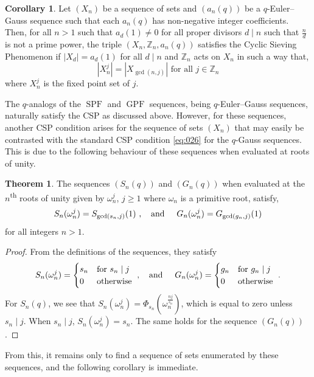 \documentclass{article}
\numberwithin{equation}{section}
\theoremstyle{definition}
\newtheorem{corollary}[definition]{\bf {Corollary}}
\newtheorem{theorem}[definition]{\bf {Theorem}}
\begin{document}
\begin{corollary}\label{coro:1} 
Let $(X_n)$ be a sequence of sets and $(a_n(q))$ be a $q$-Euler--Gauss sequence such that each $a_n(q)$ has non-negative integer coefficients. Then, for all $n>1$ such that $a_d(1)\neq0$ for all proper divisors $d\mid n$ such that $\frac{n}{d}$ is not a prime power, the triple $(X_n,\mathbb{Z}_n,a_n(q))$ satisfies the Cyclic Sieving Phenomenon if $|X_d|=a_d(1)$ for all $d\mid n$ and $\mathbb{Z}_n$ acts on $X_n$ in such a way that, 
\[|X_n^j|=|X_{\gcd(n,j)}| \text{ for all }j\in\mathbb{Z}_n\]
where $X_n^j$ is the fixed point set of $j$.
\end{corollary}

The $q$-analogs of the $\operatorname{SPF}$ and $\operatorname{GPF}$ sequences, being $q$-Euler--Gauss sequences, naturally satisfy the CSP as discussed above. However, for these sequences, another CSP condition arises for the sequence of sets $(X_n)$ that may easily be contrasted with the standard CSP condition \eqref{eq:026} for the $q$-Gauss sequences. This is due to the following behaviour of these sequences when evaluated at roots of unity. 
\begin{theorem}\label{thm:3}
    The sequences $(S_n(q))$ and $(G_n(q))$ when evaluated at the $n$\textsuperscript{th} roots of unity given by $\omega_n^j$, $j\geq1$ where $\omega_n$ is a primitive root, satisfy,
    \[S_n(\omega_n^j)=S_{\gcd(s_n,j)}(1)\text{ ,\hspace{4mm}and\hspace{5mm}} G_n(\omega_n^j)=G_{\gcd(g_n,j)}(1)\]
for all integers $n>1$. 
\end{theorem}
\begin{proof}
    From the definitions of the sequences, they satisfy
    \[S_n(\omega_n^j)=\begin{cases}
        s_n&\text{for }s_n\mid j\\
        0&\text{otherwise}
\end{cases}\text{ ,\hspace{4mm}and\hspace{5mm}} G_n(\omega_n^j)=\begin{cases}
        g_n&\text{for }g_n\mid j\\
        0&\text{otherwise}
    \end{cases}\text{ .}\]
    For $S_n(q)$, we see that $S_n(\omega_n^j)=\Phi_{s_n}(\omega_n^\frac{nj}{s_n})$, which is equal to zero unless $s_n\mid j.$ When $s_n\mid j$, $S_n(\omega_n^j)=s_n$. The same holds for the sequence $(G_n(q))$.
\end{proof}
From this, it remains only to find a sequence of sets enumerated by these sequences, and the following corollary is immediate. 
\end{document}
